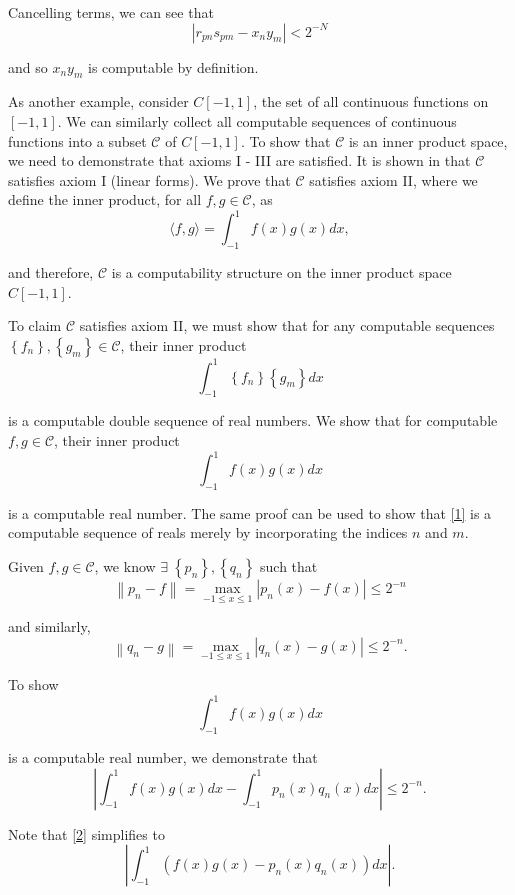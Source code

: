 \documentclass[a4paper,10pt]{article}
\begin{document}
Cancelling terms, we can see that
\[\left|r_{pn}s_{pm} - x_{n}y_{m}\right| < 2^{-N}\]

and so $x_{n}y_{m}$ is computable by definition.

As another example, consider $C\left[-1,1\right]$, the set of all continuous functions on $\left[-1,1\right]$.  We can similarly collect all computable sequences of continuous functions into a subset $\mathscr{C}$ of $C\left[-1,1\right]$.  To show that $\mathscr{C}$ is an inner product space, we need to demonstrate that axioms I - III are satisfied.  It is shown in \cite{PR89} that $\mathscr{C}$ satisfies axiom I (linear forms).  We prove that $\mathscr{C}$ satisfies axiom II, where we define the inner product, for all $f, g \in \mathscr{C}$, as
\[\langle f, g \rangle = \int_{-1}^{1}f(x)g(x)dx,\]

and therefore, $\mathscr{C}$ is a computability structure on the inner product space $C\left[-1, 1\right]$.

To claim $\mathscr{C}$ satisfies axiom II, we must show that for any computable sequences $\left\{f_{n}\right\}, \left\{g_{m}\right\} \in \mathscr{C}$, their inner product
\begin{equation}
\label{1}
\int_{-1}^{1}\left\{f_{n}\right\}\left\{g_{m}\right\}dx
\end{equation}

is a computable double sequence of real numbers.  We show that for computable $f, g \in \mathscr{C}$, their inner product
\[\int_{-1}^{1}f(x)g(x)dx\]

is a computable real number.  The same proof can be used to show that \eqref{1} is a computable sequence of reals merely by incorporating the indices $n$ and $m$.

Given $f, g \in \mathscr{C}$, we know $\exists \; \left\{p_{n}\right\}, \left\{q_{n}\right\}$ such that
\[\left\|p_{n} - f\right\| = \max_{-1\leq x \leq1} \left|p_{n}(x) - f(x)\right| \leq 2^{-n}\]

and similarly,
\[\left\|q_{n} - g\right\| = \max_{-1\leq x \leq1} \left|q_{n}(x) - g(x)\right| \leq 2^{-n}.\]

To show 
\[\int_{-1}^{1}f(x)g(x)dx\]

is a computable real number, we demonstrate that
\begin{equation}
\label{2}\left|\int_{-1}^{1}f(x)g(x)dx - \int_{-1}^{1}p_{n}(x)q_{n}(x)dx\right| \leq 2^{-n}.
\end{equation}

Note that \eqref{2} simplifies to
\[\left|\int_{-1}^{1}\left(f(x)g(x) - p_{n}(x)q_{n}(x)\right)dx\right|.\]
\end{document}
